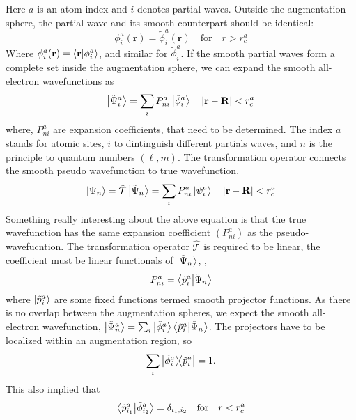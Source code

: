 Here $a$ is an atom index and $i$ denotes partial waves. Outside the augmentation sphere, the partial wave and its smooth counterpart should be identical:
\begin{equation}
\phi_i^a(\mathbf{r}) = \tilde{\phi}_i^a(\mathbf{r})\quad \text{for} \quad r > r_c^a
\end{equation} 
Where $\phi_i^a(\mathbf{r})=\braket{\mathbf{r}}{\phi_i^a}$, and similar for $\tilde{\phi}_i^a$. If the smooth partial waves form a complete set inside the augmentation sphere, we can expand the smooth all-electron wavefunctions as 
\begin{equation}
\ket{\tilde{\Psi}_i^a} = \sum_i P_{ni}^a \ket{\tilde{\phi}_i^a} \quad \abs{\mathbf{r}-\mathbf{R}} < r_c^a
\end{equation}
where, $P_{ni}^a$ are expansion coefficients, that need to be determined. The index $a$ stands for atomic sites, $i$ to dintinguish different partials waves,  and $n$ is the principle to quantum numbers $(\ell,m)$. The transformation operator connects the smooth pseudo wavefunction to true wavefunction.
\begin{equation}
\ket{\Psi_n} = \hat{\mathcal{T}} \ket{\tilde{\Psi}_n} = \sum_i P_{ni}^a \ket{\psi_i^a} \quad \abs{\mathbf{r}-\mathbf{R}} < r_c^a
\end{equation} 
Something really interesting about the above equation is that the true wavefunction has the same expansion coefficient $(P_{ni}^a)$ as the pseudo-wavefucntion. The transformation operator $\hat{\mathcal{T}}$ is required to be linear, the coefficient must be linear functionals of $\ket{\tilde{\Psi}_n}$, \ie,
\begin{equation}
P_{ni}^a = \braket{\tilde{p}_i^a}{\tilde{\Psi}_n}
\end{equation}
where $\ket{\tilde{p}_i^a}$ are some fixed functions termed smooth projector functions. As there is no overlap between the augmentation spheres, we expect the smooth all-electron wavefunction, $\ket{\tilde{\Psi}_n^a} = \sum_i \ket{\tilde{\phi}_i^a} \braket{\tilde{p}_i^a}{\tilde{\Psi}_n}$. The projectors have to be localized within an augmentation region, so
\begin{equation}
\label{eq_paw_complete}
	\sum_i \dyad{\tilde{\phi}_i^a}{\tilde{p}_i^a} = 1.
\end{equation}
This also implied that
\begin{equation}
	\braket{\tilde{p}_{i_1}^a}{\tilde{\phi}_{i_2}^a} = \delta_{i_1,i_2}\quad \text{for} \quad r < r_c^a
\end{equation}
